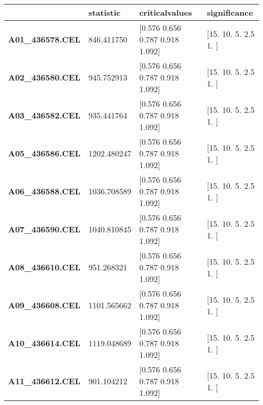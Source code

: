 \begin{tabular}{|l|l|l|l|}
\toprule
 & \bfseries statistic & \bfseries criticalvalues & \bfseries significance \\
\midrule
\bfseries A01\_436578.CEL & 846.411750 & [0.576 0.656 0.787 0.918 1.092] & [15.  10.   5.   2.5  1. ] \\
\bfseries A02\_436580.CEL & 945.752913 & [0.576 0.656 0.787 0.918 1.092] & [15.  10.   5.   2.5  1. ] \\
\bfseries A03\_436582.CEL & 935.441764 & [0.576 0.656 0.787 0.918 1.092] & [15.  10.   5.   2.5  1. ] \\
\bfseries A05\_436586.CEL & 1202.480247 & [0.576 0.656 0.787 0.918 1.092] & [15.  10.   5.   2.5  1. ] \\
\bfseries A06\_436588.CEL & 1036.708589 & [0.576 0.656 0.787 0.918 1.092] & [15.  10.   5.   2.5  1. ] \\
\bfseries A07\_436590.CEL & 1040.810845 & [0.576 0.656 0.787 0.918 1.092] & [15.  10.   5.   2.5  1. ] \\
\bfseries A08\_436610.CEL & 951.268321 & [0.576 0.656 0.787 0.918 1.092] & [15.  10.   5.   2.5  1. ] \\
\bfseries A09\_436608.CEL & 1101.565662 & [0.576 0.656 0.787 0.918 1.092] & [15.  10.   5.   2.5  1. ] \\
\bfseries A10\_436614.CEL & 1119.048689 & [0.576 0.656 0.787 0.918 1.092] & [15.  10.   5.   2.5  1. ] \\
\bfseries A11\_436612.CEL & 901.104212 & [0.576 0.656 0.787 0.918 1.092] & [15.  10.   5.   2.5  1. ] \\
\bottomrule
\end{tabular}
